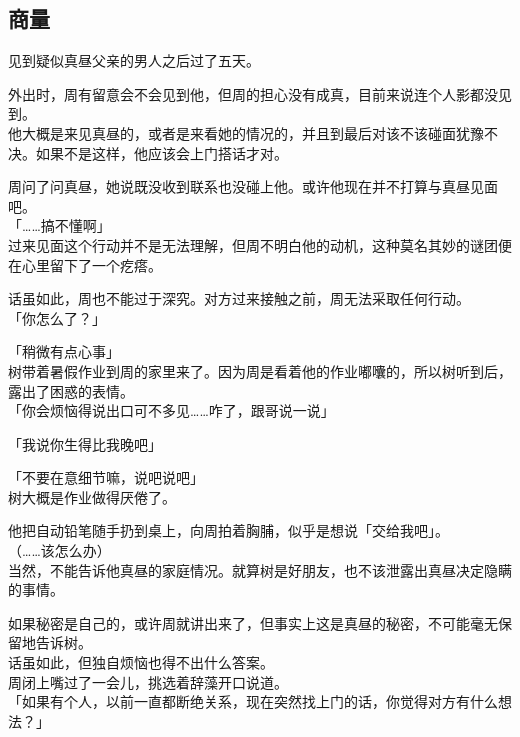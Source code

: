 \subsection{商量}

见到疑似真昼父亲的男人之后过了五天。

外出时，周有留意会不会见到他，但周的担心没有成真，目前来说连个人影都没见到。\\

他大概是来见真昼的，或者是来看她的情况的，并且到最后对该不该碰面犹豫不决。如果不是这样，他应该会上门搭话才对。

周问了问真昼，她说既没收到联系也没碰上他。或许他现在并不打算与真昼见面吧。\\

「……搞不懂啊」\\

过来见面这个行动并不是无法理解，但周不明白他的动机，这种莫名其妙的谜团便在心里留下了一个疙瘩。

话虽如此，周也不能过于深究。对方过来接触之前，周无法采取任何行动。\\

「你怎么了？」

「稍微有点心事」\\

树带着暑假作业到周的家里来了。因为周是看着他的作业嘟囔的，所以树听到后，露出了困惑的表情。\\

「你会烦恼得说出口可不多见……咋了，跟哥说一说」

「我说你生得比我晚吧」

「不要在意细节嘛，说吧说吧」\\

树大概是作业做得厌倦了。

他把自动铅笔随手扔到桌上，向周拍着胸脯，似乎是想说「交给我吧」。\\

（……该怎么办）\\

当然，不能告诉他真昼的家庭情况。就算树是好朋友，也不该泄露出真昼决定隐瞒的事情。

如果秘密是自己的，或许周就讲出来了，但事实上这是真昼的秘密，不可能毫无保留地告诉树。\\

话虽如此，但独自烦恼也得不出什么答案。\\

周闭上嘴过了一会儿，挑选着辞藻开口说道。\\

「如果有个人，以前一直都断绝关系，现在突然找上门的话，你觉得对方有什么想法？」

